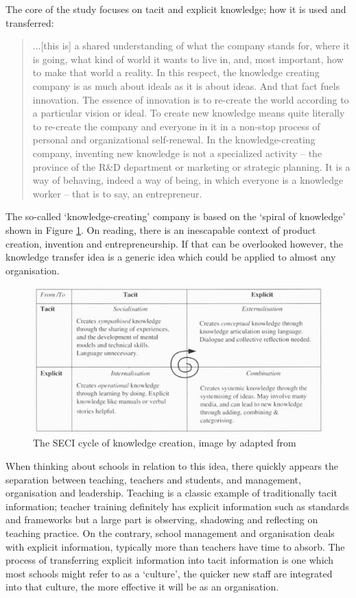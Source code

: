 \documentclass[11pt]{article}
\begin{document}
The core of the study focuses on tacit and explicit knowledge; how it is used and transferred:

\begin{quote}
	...[this is] a shared understanding of what the company stands for, where it is going, what kind of world it wants to live in, and, most important, how to make that world a reality. In this respect, the knowledge creating company is as much about ideals as it is about ideas. And that fact fuels innovation. The essence of innovation is to re-create the world according to a particular vision or ideal. To create new knowledge means quite literally to re-create the company and everyone in it in a non-stop process of personal and organizational self-renewal. In the knowledge-creating company, inventing new knowledge is not a specialized activity – the province of the R\&D department or marketing or strategic planning. It is a way of behaving, indeed a way of being, in which everyone is a knowledge worker – that is to say, an entrepreneur.
\end{quote}

The so-called `knowledge-creating' company is based on the `spiral of knowledge' shown in Figure \ref{fig:spiral}. On reading, there is an inescapable context of product creation, invention and entrepreneurship. If that can be overlooked however, the knowledge transfer idea is a generic idea which could be applied to almost any organisation.

\begin{figure}[h]
	\centering
	\captionsetup{justification=centering}
	\includegraphics[scale=0.6]{figures/spiral}
	\caption{The SECI cycle of knowledge creation, image by \citet{Hyman} adapted from \citet{nonaka1995knowledge}}
	\label{fig:spiral} 
\end{figure}

When thinking about schools in relation to this idea, there quickly appears the separation between teaching, teachers and students, and management, organisation and leadership. Teaching is a classic example of traditionally tacit information; teacher training definitely has explicit information such as standards and frameworks but a large part is observing, shadowing and reflecting on teaching practice. On the contrary, school management and organisation deals with explicit information, typically more than teachers have time to absorb. The process of transferring explicit information into tacit information is one which most schools might refer to as a `culture', the quicker new staff are integrated into that culture, the more effective it will be as an organisation.
\end{document}
